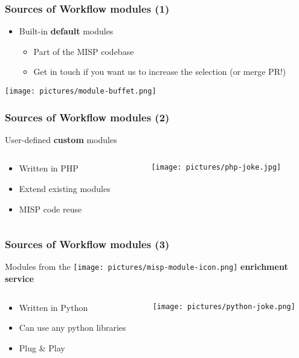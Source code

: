 \begin{frame}
    \frametitle{Sources of Workflow modules (1)}
    \begin{itemize}
        \item Built-in \textbf{default} modules
        \begin{itemize}
            \item Part of the MISP codebase
            \item Get in touch if you want us to increase the selection (or merge PR!)
        \end{itemize}
    \end{itemize}
    \vspace*{0.5em}
    \begin{center}
        \texttt{[image: pictures/module-buffet.png]}
    \end{center}
\end{frame}

\begin{frame}
    \frametitle{Sources of Workflow modules (2)}
    User-defined \textbf{custom} modules
    \vspace*{0.5em}
    \begin{columns}
        \begin{column}{0.5\textwidth}
            \begin{itemize}
                \item Written in PHP
                \item Extend existing modules
                \item MISP code reuse
            \end{itemize}
        \end{column}
        \begin{column}{0.5\textwidth}
            \texttt{[image: pictures/php-joke.jpg]}
        \end{column}
    \end{columns}
\end{frame}

\begin{frame}
    \frametitle{Sources of Workflow modules (3)}
    Modules from the \texttt{[image: pictures/misp-module-icon.png]} \textbf{enrichment service}
    \vspace*{0.5em}
    \begin{columns}
        \begin{column}{0.50\textwidth}
            \begin{itemize}
                \item Written in Python
                \item Can use any python libraries
                \item Plug \& Play
            \end{itemize}
        \end{column}
        \begin{column}{0.50\textwidth}
            \texttt{[image: pictures/python-joke.png]}
        \end{column}
    \end{columns}
\end{frame}

